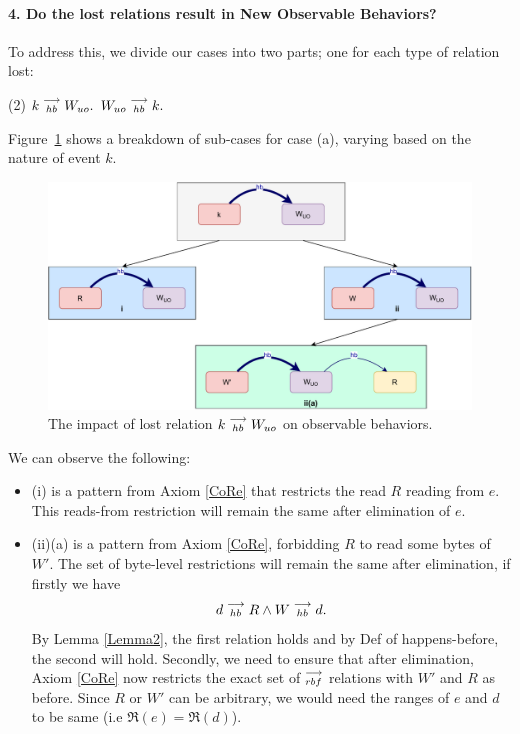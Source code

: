 \paragraph{4. Do the lost relations result in New Observable Behaviors?}

    To address this, we divide our cases into two parts; one for each type of relation lost:
    \begin{tasks}(2)
        \task $k\stackrel{\longrightarrow}{_{hb}}W_{uo}.$
        \task $W_{uo}\stackrel{\longrightarrow}{_{hb}}k.$
    \end{tasks}

    Figure~\ref{elim_write:case1} shows a breakdown of sub-cases for case (a), varying based
    on the nature of event $k$.
    \begin{figure}[H]
        \centering
        \includegraphics[scale=0.5]{5.Elimination/1.ValidEliminationCandidate/WriteElimProof/ProofParts/Part4Case1.pdf}
        \caption{The impact of lost relation $k\stackrel{\longrightarrow}{_{hb}}W_{uo}$ on observable behaviors.}
        \label{elim_write:case1}
    \end{figure}

    We can observe the following:
    \begin{itemize}
        \item (i) is a pattern from Axiom \ref{CoRe} that restricts the read $R$ reading from $e$. This reads-from restriction will remain the same after elimination of $e$. 
        \item (ii)(a) is a pattern from Axiom \ref{CoRe}, forbidding $R$ to read some bytes of $W'$. 
        The set of byte-level restrictions will remain the same after elimination, if firstly we have 
        \begin{align*}
            d\stackrel{\longrightarrow}{_{hb}}R \wedge W\stackrel{\longrightarrow}{_{hb}}d.
        \end{align*}
        By Lemma \ref{Lemma2}, the first relation holds and by Def of happens-before, the second will hold. 
        Secondly, we need to ensure that after elimination, Axiom \ref{CoRe} now restricts the exact set of $\stackrel{\longrightarrow}{_{rbf}}$ relations with $W'$ and $R$ as before. 
        Since $R$ or $W'$ can be arbitrary, we would need the ranges of $e$ and $d$ to be same (i.e $\Re(e) = \Re(d)$).
    \end{itemize}

